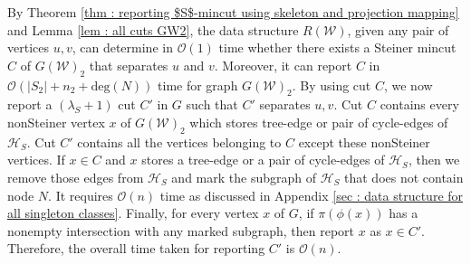 \documentclass[letterpaper,11pt]{article}
\begin{document}
By Theorem \ref{thm : reporting $S$-mincut using skeleton and projection mapping} and Lemma \ref{lem : all cuts GW2}, the data structure $R({\mathcal W})$, given any pair of vertices $u,v$, can determine in ${\mathcal O}(1)$ time whether there exists a Steiner mincut $C$ of $G({\mathcal W})_2$ that separates $u$ and $v$. Moreover, it can report $C$ in ${\mathcal O}(|S_2|+n_2+\text{deg}(N))$ time for graph $G({\mathcal W})_2$. By using cut $C$, we now report a $(\lambda_S+1)$ cut $C'$ in $G$ such that $C'$ separates $u,v$.   Cut $C$ contains every nonSteiner vertex $x$ of $G({\mathcal W})_2$ which stores tree-edge or pair of cycle-edges of ${\mathcal H}_S$. Cut $C'$ contains all the vertices belonging to $C$ except these nonSteiner vertices. If $x\in C$ and $x$ stores a tree-edge or a pair of cycle-edges of ${\mathcal H}_S$, then we remove those edges from ${\mathcal H}_S$ and mark the subgraph of ${\mathcal H}_S$ that does not contain node $N$. It requires ${\mathcal O}(n)$ time as discussed in Appendix \ref{sec : data structure for all singleton classes}. Finally, for every vertex $x$ of $G$, if $\pi(\phi(x))$ has a nonempty intersection with any marked subgraph, then report $x$ as $x\in C'$. Therefore, the overall time taken for reporting $C'$ is ${\mathcal O}(n)$.
\end{document}
